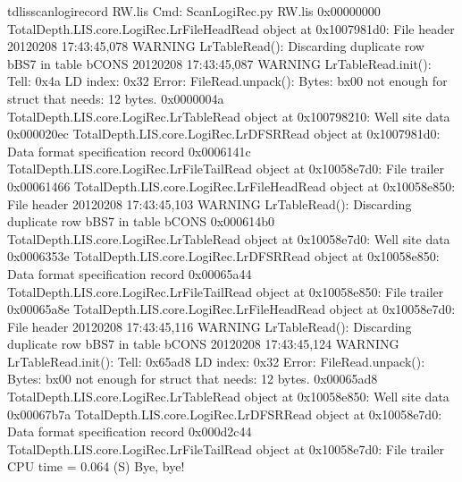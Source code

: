 \documentclass[letterpaper,10pt,english]{sphinxmanual}
\begin{document}
\begin{sphinxVerbatim}[commandchars=\\\{\}]
\PYGZdl{} tdlisscanlogirecord RW.lis
Cmd: ScanLogiRec.py RW.lis
0x00000000 \PYGZlt{}TotalDepth.LIS.core.LogiRec.LrFileHeadRead object at 0x1007981d0\PYGZgt{}: \PYGZdq{}File header\PYGZdq{}
2012\PYGZhy{}02\PYGZhy{}08 17:43:45,078 WARNING  LrTableRead(): Discarding duplicate row b\PYGZsq{}BS7 \PYGZsq{} in table b\PYGZsq{}CONS\PYGZsq{}
2012\PYGZhy{}02\PYGZhy{}08 17:43:45,087 WARNING  LrTableRead.\PYGZus{}\PYGZus{}init\PYGZus{}\PYGZus{}(): Tell: 0x4a LD index: 0x32 Error: FileRead.unpack(): Bytes: b\PYGZsq{}\PYGZbs{}x00\PYGZsq{} not enough for struct that needs: 12 bytes.
0x0000004a \PYGZlt{}TotalDepth.LIS.core.LogiRec.LrTableRead object at 0x100798210\PYGZgt{}: \PYGZdq{}Well site data\PYGZdq{}
0x000020ec \PYGZlt{}TotalDepth.LIS.core.LogiRec.LrDFSRRead object at 0x1007981d0\PYGZgt{}: \PYGZdq{}Data format specification record\PYGZdq{}
0x0006141c \PYGZlt{}TotalDepth.LIS.core.LogiRec.LrFileTailRead object at 0x10058e7d0\PYGZgt{}: \PYGZdq{}File trailer\PYGZdq{}
0x00061466 \PYGZlt{}TotalDepth.LIS.core.LogiRec.LrFileHeadRead object at 0x10058e850\PYGZgt{}: \PYGZdq{}File header\PYGZdq{}
2012\PYGZhy{}02\PYGZhy{}08 17:43:45,103 WARNING  LrTableRead(): Discarding duplicate row b\PYGZsq{}BS7 \PYGZsq{} in table b\PYGZsq{}CONS\PYGZsq{}
0x000614b0 \PYGZlt{}TotalDepth.LIS.core.LogiRec.LrTableRead object at 0x10058e7d0\PYGZgt{}: \PYGZdq{}Well site data\PYGZdq{}
0x0006353e \PYGZlt{}TotalDepth.LIS.core.LogiRec.LrDFSRRead object at 0x10058e850\PYGZgt{}: \PYGZdq{}Data format specification record\PYGZdq{}
0x00065a44 \PYGZlt{}TotalDepth.LIS.core.LogiRec.LrFileTailRead object at 0x10058e850\PYGZgt{}: \PYGZdq{}File trailer\PYGZdq{}
0x00065a8e \PYGZlt{}TotalDepth.LIS.core.LogiRec.LrFileHeadRead object at 0x10058e7d0\PYGZgt{}: \PYGZdq{}File header\PYGZdq{}
2012\PYGZhy{}02\PYGZhy{}08 17:43:45,116 WARNING  LrTableRead(): Discarding duplicate row b\PYGZsq{}BS7 \PYGZsq{} in table b\PYGZsq{}CONS\PYGZsq{}
2012\PYGZhy{}02\PYGZhy{}08 17:43:45,124 WARNING  LrTableRead.\PYGZus{}\PYGZus{}init\PYGZus{}\PYGZus{}(): Tell: 0x65ad8 LD index: 0x32 Error: FileRead.unpack(): Bytes: b\PYGZsq{}\PYGZbs{}x00\PYGZsq{} not enough for struct that needs: 12 bytes.
0x00065ad8 \PYGZlt{}TotalDepth.LIS.core.LogiRec.LrTableRead object at 0x10058e850\PYGZgt{}: \PYGZdq{}Well site data\PYGZdq{}
0x00067b7a \PYGZlt{}TotalDepth.LIS.core.LogiRec.LrDFSRRead object at 0x10058e7d0\PYGZgt{}: \PYGZdq{}Data format specification record\PYGZdq{}
0x000d2c44 \PYGZlt{}TotalDepth.LIS.core.LogiRec.LrFileTailRead object at 0x10058e7d0\PYGZgt{}: \PYGZdq{}File trailer\PYGZdq{}
CPU time =    0.064 (S)
Bye, bye!
\end{sphinxVerbatim}
\end{document}
